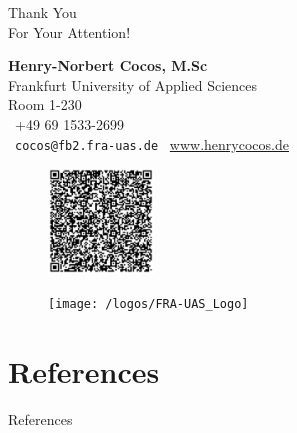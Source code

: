 \documentclass[german]{beamer}
\newif\ifgerman
\begin{document}
\else
\begin{frame}{}
	
	\begin{center}
		{\fontsize{30}{40}\selectfont Thank You\\ For Your Attention!}
	\end{center}
	\hfill
	
	\centering	
	\begin{minipage}{0.5\textwidth}
		\raggedright
		\textbf{Henry-Norbert Cocos, M.Sc}\\\vfill
		Frankfurt University of Applied Sciences\\\vfill
		Room 1-230\\\vfill
		\phone~+49 69 1533-2699\\\vfill
		\Letter~\nolinkurl{cocos@fb2.fra-uas.de}
		\Mundus~\url{www.henrycocos.de}
		\begin{figure}[htbp]
			\raggedright
			\includegraphics[width=0.25\textwidth]{Cocos_FRAUAS}
		\end{figure}
	\end{minipage}%
	\begin{minipage}{0.45\textwidth}
			\begin{figure}[htbp]
			\centering
			\texttt{[image: /logos/FRA-UAS\_Logo]}
		\end{figure}
		\vspace{40pt}
	\end{minipage}
	
\end{frame}
\fi


\ifgerman
\section{Quellen}
\label{sec:References}


\begin{frame}[plain,allowframebreaks]{Quellen}
	\small
	
	
\end{frame}
\else
\section{References}
\label{sec:References}


\begin{frame}{References}
	\small
	
	
\end{frame}
\fi
\end{document}
